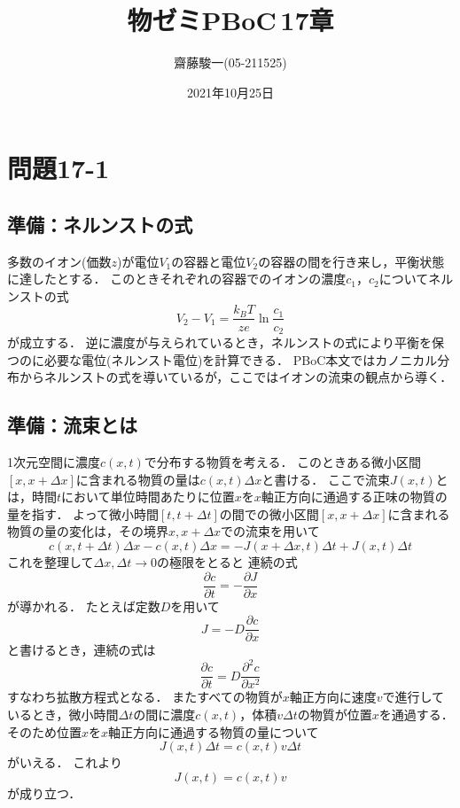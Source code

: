 \documentclass[a4paper,11pt]{jsarticle}
\begin{document}
\title{物ゼミPBoC\,17章}
\author{齋藤駿一(05-211525)}
\date{2021年10月25日}
\maketitle

\tableofcontents

\section{問題17-1}
\subsection{準備：ネルンストの式}
多数のイオン(価数$z$)が電位$V_1$の容器と電位$V_2$の容器の間を行き来し，平衡状態に達したとする．
このときそれぞれの容器でのイオンの濃度$c_1$，$c_2$についてネルンストの式
\begin{equation}
  V_2 - V_1 = \frac{k_BT}{ze} \ln{\frac{c_1}{c_2}}
\end{equation}
が成立する．
逆に濃度が与えられているとき，ネルンストの式により平衡を保つのに必要な電位(ネルンスト電位)を計算できる．
PBoC本文ではカノニカル分布からネルンストの式を導いているが，ここではイオンの流束の観点から導く．

\subsection{準備：流束とは}
1次元空間に濃度$c(x,t)$で分布する物質を考える．
このときある微小区間$[x,x+\Delta x]$に含まれる物質の量は$c(x,t)\Delta x$と書ける．
ここで流束$J(x,t)$とは，時間$t$において単位時間あたりに位置$x$を$x$軸正方向に通過する正味の物質の量を指す．
よって微小時間$[t, t+\Delta t]$の間での微小区間$[x,x+\Delta x]$に含まれる物質の量の変化は，その境界$x, x+\Delta x$での流束を用いて
\begin{equation}
  c(x, t+\Delta t)\Delta x - c(x, t)\Delta x = - J(x+\Delta x,t)\Delta t + J(x, t)\Delta t 
\end{equation}
これを整理して$\Delta x, \Delta t \to 0$の極限をとると
連続の式
\begin{equation}
  \frac{\partial c}{\partial t} = - \frac{\partial J}{\partial x}
\end{equation}
が導かれる．
たとえば定数$D$を用いて
\begin{equation}
  J = - D \frac{\partial c}{\partial x}
\end{equation}
と書けるとき，連続の式は
\begin{equation}
  \frac{\partial c}{\partial t} = D\frac{\partial^2c}{\partial x^2}
\end{equation}
すなわち拡散方程式となる．
またすべての物質が$x$軸正方向に速度$v$で進行しているとき，微小時間$\Delta t$の間に濃度$c(x,t)$，体積$v\Delta t$の物質が位置$x$を通過する．
そのため位置$x$を$x$軸正方向に通過する物質の量について
\begin{equation}
  J(x,t) \Delta t= c(x,t) v\Delta t 
\end{equation}
がいえる．
これより
\begin{equation}
  J(x, t) = c(x, t) v
\end{equation}
が成り立つ．
\end{document}
